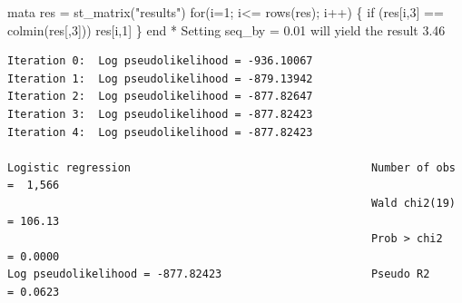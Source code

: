 \documentclass[
  10pt,
  a4paper,
]{book}
\newenvironment{Shaded}{\begin{snugshade}}{\end{snugshade}}
\newcommand{\BaseNTok}[1]{\textcolor[rgb]{0.68,0.00,0.00}{#1}}
\newcommand{\KeywordTok}[1]{\textcolor[rgb]{0.00,0.46,0.62}{#1}}
\newcommand{\NormalTok}[1]{\textcolor[rgb]{0.00,0.46,0.62}{#1}}
\newcommand{\StringTok}[1]{\textcolor[rgb]{0.13,0.47,0.30}{#1}}
\begin{document}
\begin{Shaded}
\begin{Highlighting}[]
\KeywordTok{mata}
\NormalTok{res = st\_matrix(}\StringTok{"results"}\NormalTok{)}
\KeywordTok{for}\NormalTok{(i=1; i\textless{}= }\BaseNTok{rows}\NormalTok{(res); i++) \{ }
  \KeywordTok{if}\NormalTok{ (res[i,3] == }\KeywordTok{colmin}\NormalTok{(res[,3])) res[i,1]}
\NormalTok{\}}
\KeywordTok{end}
\NormalTok{* Setting seq\_by = 0.01 will yield the result 3.46}
\end{Highlighting}
\end{Shaded}

\begin{verbatim}
Iteration 0:  Log pseudolikelihood = -936.10067  
Iteration 1:  Log pseudolikelihood = -879.13942  
Iteration 2:  Log pseudolikelihood = -877.82647  
Iteration 3:  Log pseudolikelihood = -877.82423  
Iteration 4:  Log pseudolikelihood = -877.82423  

Logistic regression                                     Number of obs =  1,566
                                                        Wald chi2(19) = 106.13
                                                        Prob > chi2   = 0.0000
Log pseudolikelihood = -877.82423                       Pseudo R2     = 0.0623


\end{verbatim}
\end{document}
